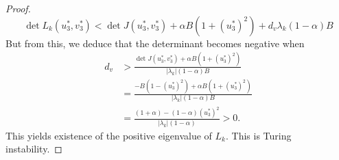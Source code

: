 \documentclass[11pt, a4paper]{article}
\theoremstyle{break}
\theoremstyle{break}
\theoremstyle{break}
\theoremstyle{break}
\theoremstyle{break}
\theoremstyle{break}
\theoremstyle{break}
\theoremstyle{break}
\theoremstyle{break}
\theoremstyle{break}
\begin{document}
\begin{proof}
\begin{equation*}
        \det L_k(u_3^*, v_3^*) < \det J(u_3^*, v_3^*) + \alpha B (1 + (u_3^*)^2) + d_v \lambda_k (1 - \alpha) B
    \end{equation*}
    But from this, we deduce that the determinant becomes negative when
    \begin{align*}
        d_v 
        &> \frac{\det J(u_3^*, v_3^*) + \alpha B (1 + (u_3^*)^2)}{|\lambda_k| (1-\alpha) B} \\
        &= \frac{-B(1-(u_3^*)^2) + \alpha B (1 + (u_3^*)^2)}{|\lambda_k|(1-\alpha) B} \\
        &= \frac{(1 + \alpha) - (1 - \alpha) (u_3^*)^2}{|\lambda_k|(1 - \alpha)} > 0.
    \end{align*}
    This yields existence of the positive eigenvalue of $L_k$. This is Turing instability.
\end{proof}



\end{document}
